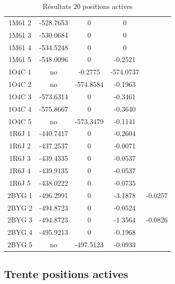 \documentclass[a4paper,12pt]{article}
\begin{document}
\begin{table}[h]
\begin{tabular}{|c|c|c|c|c|}
        1M61 2 & -528.7653 & 0 & 0 & \\
        1M61 3 & -530.0684 & 0 & 0 & \\
        1M61 4 & -534.5248 & 0 & 0 & \\
        1M61 5 & -548.0096 & 0 & -0.2521 & \\
        1O4C 1 & no & -0.2775 & -574.0737 & \\
        1O4C 2 & no & -574.8584 & -0.1963 & \\
        1O4C 3 & -573.6314 & 0 & -0.3461 & \\
        1O4C 4 & -575.8667 & 0 & -0.3640 & \\
        1O4C 5 & no & -573.3479 & -0.1141 & \\
        1R6J 1 & -440.7417 & 0 & -0.2604 & \\
        1R6J 2 & -437.2537 & 0 & -0.0071 & \\
        1R6J 3 & -439.4335 & 0 & -0.0537 & \\
        1R6J 4 & -439.9135 & 0 & -0.0537 & \\
        1R6J 5 & -438.0222 & 0 & -0.0735 & \\
        2BYG 1 & -496.2991 & 0 & -3.1878 & -0.0257 \\
        2BYG 2 & -494.8723 & 0 & -0.0524 & \\
        2BYG 3 & -494.8723 & 0 & -1.3564 & -0.0826\\
        2BYG 4 & -495.9213 & 0 & -0.1968 & \\
        2BYG 5 & no & -497.5123 & -0.0933 & \\
        
        \hline




 \end{tabular}      
 \caption{Résultats 20 positions actives }
 \label{tab_echec2BYG__1}      
\end{table}



   \subsection{ Trente positions actives}
\end{document}
